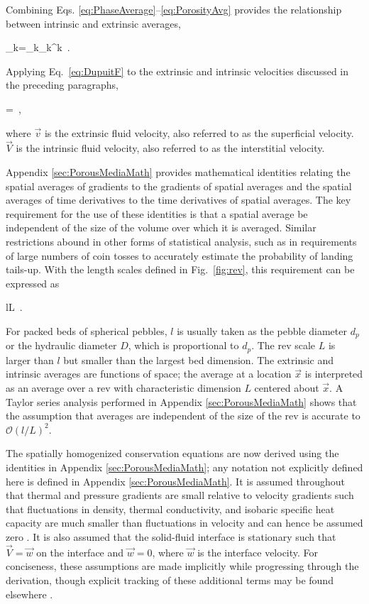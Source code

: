 Combining Eqs. \eqref{eq:PhaseAverage}--\eqref{eq:PorosityAvg} provides the relationship between intrinsic and extrinsic averages,

\beq
\label{eq:DupuitF}
\la\Phi_k\ra=\epsilon_k\la\Phi_k\ra^k\ .
\eeq

\noindent Applying Eq.\ \eqref{eq:DupuitF} to the extrinsic and intrinsic velocities discussed in the preceding paragraphs,

\beq
\label{eq:DupuitForchiemer}
=\epsilon{}\ ,
\eeq

\noindent where \(\vec{v}\) is the extrinsic fluid velocity, also referred to as the superficial velocity. \(\vec{V}\) is the intrinsic fluid velocity, also referred to as the interstitial velocity. 

Appendix \ref{sec:PorousMediaMath} provides mathematical identities relating the spatial averages of gradients to the gradients of spatial averages and the spatial averages of time derivatives to the time derivatives of spatial averages. The key requirement for the use of these identities is that a spatial average be independent of the size of the volume over which it is averaged. Similar restrictions abound in other forms of statistical analysis, such as in requirements of large numbers of coin tosses to accurately estimate the probability of landing tails-up. With the length scales defined in Fig.\ \ref{fig:rev}, this requirement can be expressed as

\beq
\label{eq:LengthReqs}
l\ll L\ .
\eeq

\noindent For packed beds of spherical pebbles, \(l\) is usually taken as the pebble diameter \(d_p\) or the hydraulic diameter \(D\), which is proportional to \(d_p\). The \gls{rev} scale \(L\) is larger than \(l\) but smaller than the largest bed dimension. The extrinsic and intrinsic averages are functions of space; the average at a location \(\vec{x}\) is interpreted as an average over a \gls{rev} with characteristic dimension \(L\) centered about \(\vec{x}\). A Taylor series analysis performed in Appendix \ref{sec:PorousMediaMath} shows that the assumption that averages are independent of the size of the \gls{rev} is accurate to \(\mathcal{O}(l/L)^2\).

The spatially homogenized conservation equations are now derived using the identities in Appendix \ref{sec:PorousMediaMath}; any notation not explicitly defined here is defined in Appendix \ref{sec:PorousMediaMath}. It is assumed throughout that thermal and pressure gradients are small relative to velocity gradients such that fluctuations in density, thermal conductivity, and isobaric specific heat capacity are much smaller than fluctuations in velocity and can hence be assumed zero \cite{gray}. It is also assumed that the solid-fluid interface is stationary such that \(\vec{V}=\vec{w}\) on the interface and \(\vec{w}=0\), where \(\vec{w}\) is the interface velocity. For conciseness, these assumptions are made implicitly while progressing through the derivation, though explicit tracking of these additional terms may be found elsewhere \cite{novak_manual}.

